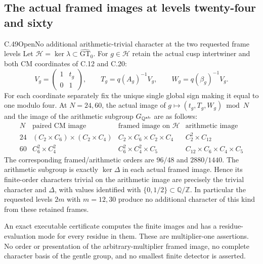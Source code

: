 \subsection{The actual framed images at levels twenty-four and sixty}

\begin{statement}{C.49}{Open}{No additional arithmetic-trivial character at the two requested frame levels}
Let $\mathcal H=\ker\lambda\subset\widehat{\mathrm{GT}}_0$.
For $g\in\mathcal H$ retain the actual cusp intertwiner and both
CM coordinates of C.12 and C.20:
\[
 V_g=\begin{pmatrix}1&t_g\\0&1\end{pmatrix},\qquad
 T_g=q(A_g)^{-1}V_g,\qquad W_g=q(\beta_g)^{-1}V_g.
                                                               \tag{C.49.1}
\]
For each coordinate separately fix the unique single global sign
making it equal to one modulo four. At $N=24,60$, the actual
image of $g\mapsto(t_g,T_g,W_g)\bmod N$ and the image of the
arithmetic subgroup $G_{\mathbb Q^{\rm ab}}$ are as follows:
\[
\begin{array}{c|c|c|c}
 N&\text{paired CM image}&\text{framed image on }\mathcal H
       &\text{arithmetic image}\\\hline
24&(C_2\times C_6)\times(C_2\times C_4)
   &C_2\times C_6\times C_2\times C_4&C_2^2\times C_{12}\\
60&C_6^2\times C_4^2
   &C_6^2\times C_4^2\times C_5&C_{12}\times C_6\times C_4\times C_5
\end{array}                                                    \tag{C.49.2}
\]
The corresponding framed/arithmetic orders are $96/48$ and
$2880/1440$. The arithmetic subgroup is exactly $\ker\Delta$
in each actual framed image. Hence its finite-order characters
trivial on the arithmetic image are precisely the trivial character
and $\Delta$, with values identified with $\{0,1/2\}\subset\mathbb Q/\mathbb Z$.
In particular the requested levels $2m$ with $m=12,30$ produce
no additional character of this kind from these retained frames.

An exact executable certificate computes the finite images and
has a residue-evaluation mode for every residue in them. These
are multiplier-one assertions. No order or presentation of the
arbitrary-multiplier framed image, no complete character basis
of the gentle group, and no smallest finite detector is asserted.
\end{statement}


